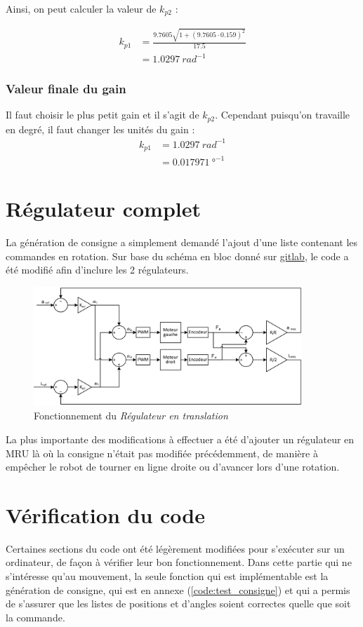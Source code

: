 Ainsi, on peut calculer la valeur de $k_{p2}$ :

\begin{align*}
     k_{p1} &= \frac{9.7605 \sqrt{1 +(9.7605 \cdot 0.159)^2 }}{ 17.5} \\
     &= 1.0297\ rad^{-1}
\end{align*}

\subsubsection{Valeur finale du gain}

Il faut choisir le plus petit gain et il s'agit de $k_{p2}$. Cependant puisqu'on travaille en degré, il faut changer les unités du gain :
\begin{align*}
     k_{p1} &= 1.0297\ rad^{-1} \\
     &= 0.017971 \ \text{°}^{-1}
\end{align*}


\section{Régulateur complet}

La génération de consigne a simplement demandé l'ajout d'une liste contenant les commandes en rotation. Sur base du schéma en bloc donné sur \href{https://gitlab.com/mosee/elech309-2024}{gitlab}, le code a été modifié afin d'inclure les 2 régulateurs.

\begin{figure}[H]
    \centering
    \includegraphics[width=0.9\textwidth]{Pictures/regul_pol.png}
    \caption{Fonctionnement du \textit{Régulateur en translation}}
    \label{fig:enter-label}
\end{figure}

La plus importante des modifications à effectuer a été d'ajouter un régulateur en MRU là où la consigne n'était pas modifiée précédemment, de manière à empêcher le robot de tourner en ligne droite ou d'avancer lors d'une rotation.

\section{Vérification du code}

Certaines sections du code ont été légèrement modifiées pour s'exécuter sur un ordinateur, de façon à vérifier leur bon fonctionnement. Dans cette partie qui ne s'intéresse qu'au mouvement, la seule fonction qui est implémentable est la génération de consigne, qui est en annexe (\ref{code:test_consigne}) et qui a permis de s'assurer que les listes de positions et d'angles soient correctes quelle que soit la commande.
